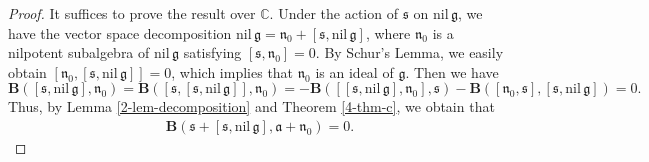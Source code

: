 \documentclass[reqno]{amsart}
\theoremstyle{definition}
\begin{document}
\begin{proof}
It suffices to prove the result over $\mathbb{C}$. Under the action of $\mathfrak{s}$ on $\mathrm{nil}\,\mathfrak{g}$, we have the vector space decomposition   $\mathrm{nil}\,\mathfrak{g}=\mathfrak{n}_{0}+[\mathfrak{s},\mathrm{nil}\,\mathfrak{g}]$, where $\mathfrak{n}_{0}$ is a nilpotent subalgebra of $\mathrm{nil}\,\mathfrak{g}$ satisfying $[\mathfrak{s},\mathfrak{n}_{0}]=0$. By Schur's Lemma, we easily obtain $[\mathfrak{n}_{0},[\mathfrak{s},\mathrm{nil}\,\mathfrak{g}]]=0$, which implies that $\mathfrak{n}_{0}$ is an ideal of $\mathfrak{g}$.
 Then we have
 $$ \mathbf{B}([\mathfrak{s},\mathrm{nil}\,\mathfrak{g}],\mathfrak{n}_{0})
 =\mathbf{B}([\mathfrak{s},[\mathfrak{s},\mathrm{nil}\,\mathfrak{g}]],\mathfrak{n}_{0})
 =-\mathbf{B}([[\mathfrak{s},\mathrm{nil}\,\mathfrak{g}],\mathfrak{n}_{0}],\mathfrak{s})
 -\mathbf{B}([\mathfrak{n}_{0},\mathfrak{s}],[\mathfrak{s},\mathrm{nil}\,\mathfrak{g}])
 =0.$$
  Thus, by Lemma \ref{2-lem-decomposition} and Theorem \ref{4-thm-c}, we obtain that
\begin{eqnarray*}
\mathbf{B}(\mathfrak{s}+[\mathfrak{s},\mathrm{nil}\,\mathfrak{g}],\mathfrak{a}+\mathfrak{n}_{0})=0.
\end{eqnarray*}



\end{proof}
\end{document}
